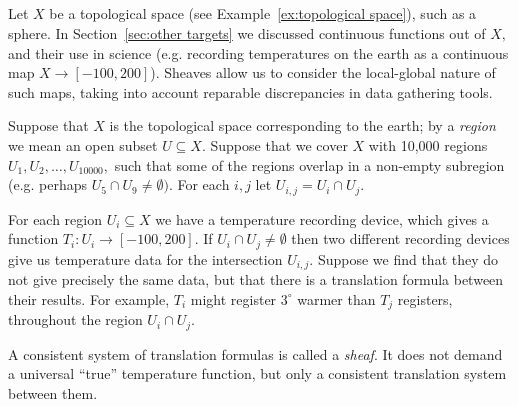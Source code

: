 \documentclass[../main/CT4S-EN-RU]{subfiles}
\begin{document}
\begin{applicationRUS}
\end{applicationRUS}


\subsection{}\label{sec:sheaves}

\begin{blockENG}
Let $X$ be a topological space (see Example~\ref{ex:topological space}), such as a sphere. In Section~\ref{sec:other targets} we discussed continuous functions out of $X,$ and their use in science (e.g. recording temperatures on the earth as a continuous map $X{→}[-100,200]$). Sheaves allow us to consider the local-global nature of such maps, taking into account reparable discrepancies in data gathering tools. 
\end{blockENG}

\begin{blockRUS}
\end{blockRUS}

\begin{applicationENG}\label{app:sheaves of temperature}
Suppose that $X$ is the topological space corresponding to the earth; by a {\em region} we mean an open subset $U\subseteq X.$ Suppose that we cover $X$ with 10,000 regions $U_1,U_2,\ldots,U_{10000},$ such that some of the regions overlap in a non-empty subregion (e.g. perhaps $U_5\cap U_9\neq\emptyset).$ For each $i,j$ let $U_{i,j}=U_i\cap U_j.$ 

For each region $U_i\subseteq X$ we have a temperature recording device, which gives a function $T_i\colon U_i{→}[-100,200].$ If $U_i\cap U_j\neq\emptyset$ then two different recording devices give us temperature data for the intersection $U_{i,j}.$ Suppose we find that they do not give precisely the same data, but that there is a translation formula between their results. For example, $T_i$ might register $3^\circ$ warmer than $T_j$ registers, throughout the region $U_i\cap U_j.$

A consistent system of translation formulas is called a {\em sheaf}. It does not demand a universal “true” temperature function, but only a consistent translation system between them. 
\end{applicationENG}

\begin{applicationRUS}\label{app:sheaves of temperature}
\end{applicationRUS}
\end{document}
